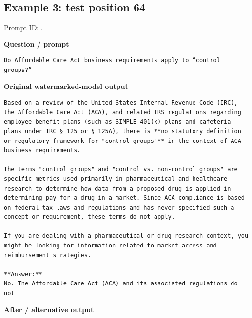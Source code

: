 \subsection{Example 3: test position
64}\label{record-docs-watermarking-qualitative-text-latent-bira-md-example-3-test-position-64}

Prompt ID:
\texttt{}.

\textbf{Question / prompt}

\begin{Verbatim}
Do Affordable Care Act business requirements apply to “control groups?”
\end{Verbatim}

\textbf{Original watermarked-model output}

\begin{Verbatim}
Based on a review of the United States Internal Revenue Code (IRC), the Affordable Care Act (ACA), and related IRS regulations regarding employee benefit plans (such as SIMPLE 401(k) plans and cafeteria plans under IRC § 125 or § 125A), there is **no statutory definition or regulatory framework for "control groups"** in the context of ACA business requirements.

The terms "control groups" and "control vs. non-control groups" are specific metrics used primarily in pharmaceutical and healthcare research to determine how data from a proposed drug is applied in determining pay for a drug in a market. Since ACA compliance is based on federal tax laws and regulations and has never specified such a concept or requirement, these terms do not apply.

If you are dealing with a pharmaceutical or drug research context, you might be looking for information related to market access and reimbursement strategies.

**Answer:**
No. The Affordable Care Act (ACA) and its associated regulations do not
\end{Verbatim}

\textbf{After / alternative output}

